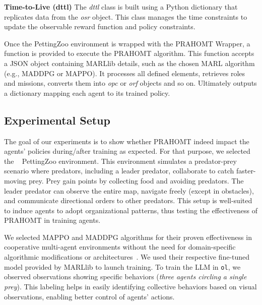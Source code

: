 \documentclass[runningheads]{llncs}
\theoremstyle{freethm}
\theoremstyle{proofoutline}
\begin{document}
\textbf{Time-to-Live (dttl)} \quad The \textit{dttl} class is built using a Python dictionary that replicates data from the \textit{osr} object. This class manages the time constraints to update the observable reward function and policy constraints.

Once the PettingZoo environment is wrapped with the PRAHOMT Wrapper, a function is provided to execute the PRAHOMT algorithm. This function accepts a JSON object containing MARLlib details, such as the chosen MARL algorithm (e.g., MADDPG or MAPPO). It processes all defined elements, retrieves roles and missions, converts them into \textit{opc} or \textit{orf} objects and so on. Ultimately outputs a dictionary mapping each agent to its trained policy.


\subsection{Experimental Setup}

The goal of our experiments is to show whether PRAHOMT indeed impact the agents' policies during/after training as expected. For that purpose, we selected the ~\cite{Lowe2017} PettingZoo environment. This environment simulates a predator-prey scenario where predators, including a leader predator, collaborate to catch faster-moving prey. Prey gain points by collecting food and avoiding predators. The leader predator can observe the entire map, navigate freely (except in obstacles), and communicate directional orders to other predators. This setup is well-suited to induce agents to adopt organizational patterns, thus testing the effectiveness of PRAHOMT in training agents.



\noindent We selected MAPPO and MADDPG algorithms for their proven effectiveness in cooperative multi-agent environments without the need for domain-specific algorithmic modifications or architectures~\cite{Yu2022}. We used their respective fine-tuned model provided by MARLlib to launch training.
%
To train the LLM in \texttt{ol}, we observed observations showing specific behaviors (\textit{three agents circling a single prey}). This labeling helps in easily identifying collective behaviors based on visual observations, enabling better control of agents' actions.
\end{document}
